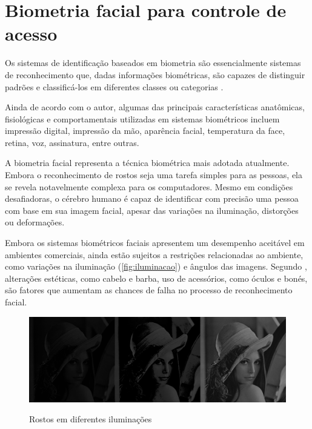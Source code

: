 \section{Biometria facial para controle de acesso}\label{sec:biometriaFacial}

Os sistemas de identificação baseados em biometria são essencialmente sistemas de 
reconhecimento que, dadas informações biométricas, são capazes de distinguir padrões e 
classificá-los em diferentes classes ou categorias \cite{morais2010}.

Ainda de acordo com o autor, algumas das principais características anatômicas, 
fisiológicas e comportamentais utilizadas em sistemas biométricos incluem 
impressão digital, impressão da mão, aparência facial, temperatura da face, 
retina, voz, assinatura, entre outras.

A biometria facial representa a técnica biométrica mais adotada atualmente. 
Embora o reconhecimento de rostos seja uma tarefa simples para as 
pessoas, ela se revela notavelmente complexa para os computadores. 
Mesmo em condições desafiadoras, o cérebro humano é capaz de identificar 
com precisão uma pessoa com base em sua imagem facial, apesar das variações 
na iluminação, distorções ou deformações.

Embora os sistemas biométricos faciais apresentem um desempenho aceitável em 
ambientes comerciais, ainda estão sujeitos a restrições relacionadas ao ambiente, 
como variações na iluminação (\autoref{fig:iluminacao}) e ângulos das imagens.
Segundo , alterações estéticas, como cabelo e barba, uso de
acessórios, como óculos e bonés, são fatores que aumentam as chances de falha no processo
de reconhecimento facial.

\begin{figure}[h!]
    \centering
    \caption{Rostos em diferentes iluminações}
    \includegraphics[scale=0.25]{figuras/iluminacao.png}
    \label{fig:iluminacao}
    \centering
\end{figure}

